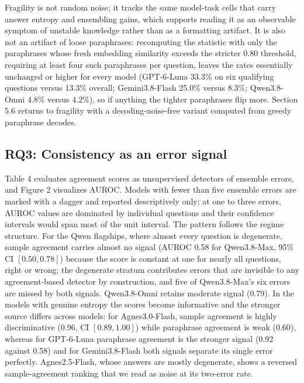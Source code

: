 \documentclass[preprint,12pt]{elsarticle}
\begin{document}
Fragility is not random noise; it tracks the same model-task cells that carry answer entropy and ensembling gains, which supports reading it as an observable symptom of unstable knowledge rather than as a formatting artifact. It is also not an artifact of loose paraphrases: recomputing the statistic with only the paraphrases whose fresh embedding similarity exceeds the stricter 0.80 threshold, requiring at least four such paraphrases per question, leaves the rates essentially unchanged or higher for every model (GPT-6-Luna 33.3\% on six qualifying questions versus 13.3\% overall; Gemini3.8-Flash 25.0\% versus 8.3\%; Qwen3.8-Omni 4.8\% versus 4.2\%), so if anything the tighter paraphrases flip more. Section 5.6 returns to fragility with a decoding-noise-free variant computed from greedy paraphrase decodes.

\subsection{RQ3: Consistency as an error signal}


Table 4 evaluates agreement scores as unsupervised detectors of ensemble errors, and Figure 2 visualizes AUROC. Models with fewer than five ensemble errors are marked with a dagger and reported descriptively only; at one to three errors, AUROC values are dominated by individual questions and their confidence intervals would span most of the unit interval. The pattern follows the regime structure. For the Qwen flagships, where almost every question is degenerate, sample agreement carries almost no signal (AUROC 0.58 for Qwen3.8-Max, 95\% CI $[0.50, 0.78]$) because the score is constant at one for nearly all questions, right or wrong; the degenerate stratum contributes errors that are invisible to any agreement-based detector by construction, and five of Qwen3.8-Max's six errors are missed by both signals. Qwen3.8-Omni retains moderate signal (0.79). In the models with genuine entropy the scores become informative and the stronger source differs across models: for Agnes3.0-Flash, sample agreement is highly discriminative (0.96, CI $[0.89, 1.00]$) while paraphrase agreement is weak (0.60), whereas for GPT-6-Luna paraphrase agreement is the stronger signal (0.92 against 0.58) and for Gemini3.8-Flash both signals separate its single error perfectly. Agnes2.5-Flash, whose answers are mostly degenerate, shows a reversed sample-agreement ranking that we read as noise at its two-error rate.
\end{document}
